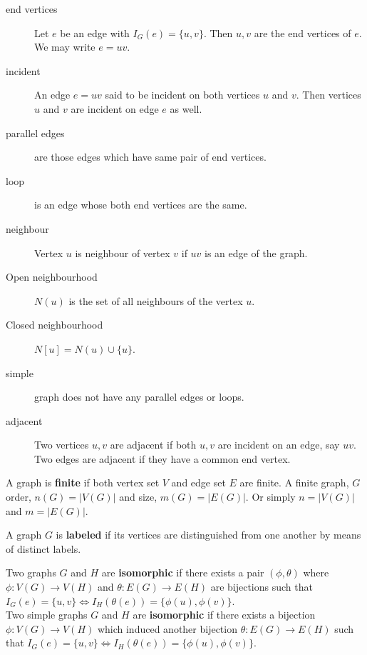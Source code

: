 \begin{description}
	\item[end vertices] Let $e$ be an edge with $I_G(e) = \{ u,v \}$. Then $u,v$ are the end vertices of $e$. We may write $e = uv$.
	\item[incident] An edge $e =uv $ said to be incident on both vertices $u$ and $v$. Then vertices $u$ and $v$ are incident on edge $e$ as well. 
	\item[parallel edges] are those edges which have same pair of end vertices.
	\item[loop] is an edge whose both end vertices are the same.
	\item[neighbour] Vertex $u$ is neighbour of vertex $v$ if $uv$ is an edge of the graph.
	\item[Open neighbourhood] $N(u)$ is the set of all neighbours of the vertex $u$.
	\item[Closed neighbourhood] $N[u] = N(u) \cup \{ u \}$.
	\item[simple] graph does not have any parallel edges or loops.
	\item[adjacent] Two vertices $u,v$ are adjacent if both $u,v$ are incident on an edge, say $uv$. Two edges are adjacent if they have a common end vertex.
\end{description}
\begin{definition}
	A graph is \textbf{finite} if both vertex set $V$ and edge set $E$ are finite. A finite graph, $G$ order, $n(G) = |V(G)|$ and size, $m(G) = |E(G)|$. Or simply $n = |V(G)|$ and $m = |E(G)|$.
\end{definition}

\begin{definition}
	A graph $G$ is \textbf{labeled} if its vertices are distinguished from one another by means of distinct labels.
\end{definition}

\begin{definition}
	Two graphs $G$ and $H$ are \textbf{isomorphic} if there exists a pair $(\phi,\theta)$ where $\phi : V(G) \to V(H)$ and $\theta : E(G) \to E(H)$ are bijections such that $I_G(e) = \{ u,v \} \iff I_H(\theta(e)) = \{ \phi(u),\phi(v) \}$.\\

	Two simple graphs $G$ and $H$ are \textbf{isomorphic} if there exists a bijection $\phi : V(G) \to V(H)$ which induced another bijection $\theta : E(G) \to E(H)$ such that $I_G(e) = \{ u,v \} \iff I_H(\theta(e)) = \{ \phi(u),\phi(v) \}$.
\end{definition}

